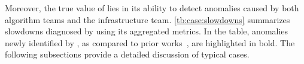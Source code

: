 Moreover, the true value of \sysname{} lies in its ability to detect anomalies caused by both algorithm teams and the infrastructure team. \autoref{tb:case:slowdowns} summarizes slowdowns diagnosed by \sysname{} using its aggregated metrics.
In the table, anomalies newly identified by \sysname{}, as compared to prior works~\cite{jiangMegaScaleScaling}, are highlighted in bold. The following subsections provide a detailed discussion of typical cases.




